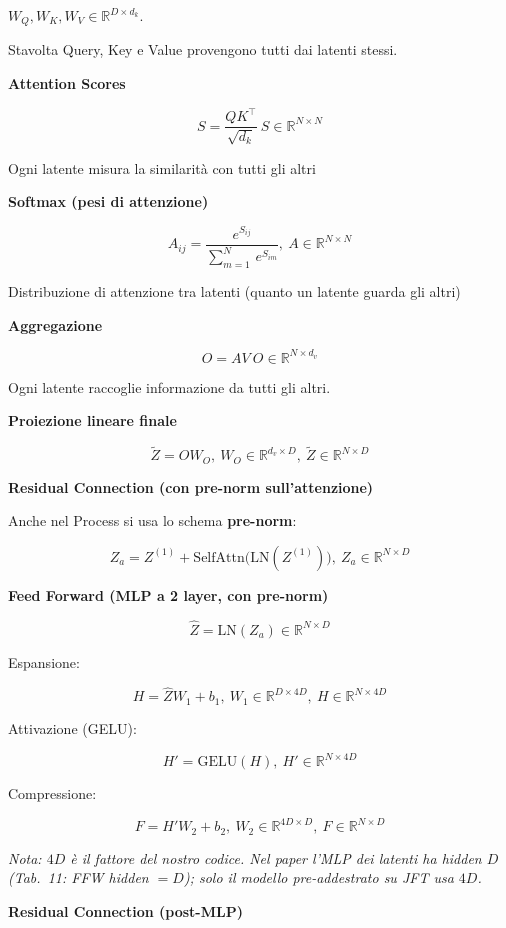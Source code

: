 \documentclass[
  11pt,
]{article}
\begin{document}
\(W_{Q},W_{K},W_{V} \in \mathbb{R}^{D \times d_{k}}\).

Stavolta Query, Key e Value provengono tutti dai latenti stessi.

\textbf{Attention Scores}

\[S = \frac{QK^{\top}}{\sqrt{d_{k}}}\ S \in \mathbb{R}^{N \times N}\]

Ogni latente misura la similarità con tutti gli altri

\textbf{Softmax (pesi di attenzione)}

\[A_{ij} = \frac{e^{S_{ij}}}{\sum_{m = 1}^{N}\, e^{S_{im}}},\ A \in \mathbb{R}^{N \times N}\]

Distribuzione di attenzione tra latenti (quanto un latente guarda gli
altri)

\textbf{Aggregazione}

\[O = AV\ O \in \mathbb{R}^{N \times d_{v}}\]

Ogni latente raccoglie informazione da tutti gli altri.

\textbf{Proiezione lineare finale}

\[\widetilde{Z} = OW_{O},\ W_{O} \in \mathbb{R}^{d_{v} \times D},\ \widetilde{Z} \in \mathbb{R}^{N \times D}\]

\textbf{Residual Connection (con pre-norm sull'attenzione)}

Anche nel Process si usa lo schema \textbf{pre-norm}:

\[Z_{a} = Z^{(1)} + \text{SelfAttn}\!\bigl(\mathrm{LN}(Z^{(1)})\bigr),\ Z_{a} \in \mathbb{R}^{N \times D}\]

\textbf{Feed Forward (MLP a 2 layer, con pre-norm)}

\[\widehat{Z} = \mathrm{LN}(Z_{a}) \in \mathbb{R}^{N \times D}\]

Espansione:

\[H = \widehat{Z}W_{1} + b_{1},\ W_{1} \in \mathbb{R}^{D \times 4D},\ H \in \mathbb{R}^{N \times 4D}\]

Attivazione (GELU):

\[H' = \mathrm{GELU}(H),\ H' \in \mathbb{R}^{N \times 4D}\]

Compressione:

\[F = H'W_{2} + b_{2},\ W_{2} \in \mathbb{R}^{4D \times D},\ F \in \mathbb{R}^{N \times D}\]

\emph{Nota: $4D$ è il fattore del nostro codice. Nel paper l'MLP dei latenti ha hidden $D$ (Tab.~11: FFW hidden $= D$); solo il modello pre-addestrato su JFT usa $4D$.}

\textbf{Residual Connection (post-MLP)}
\end{document}
